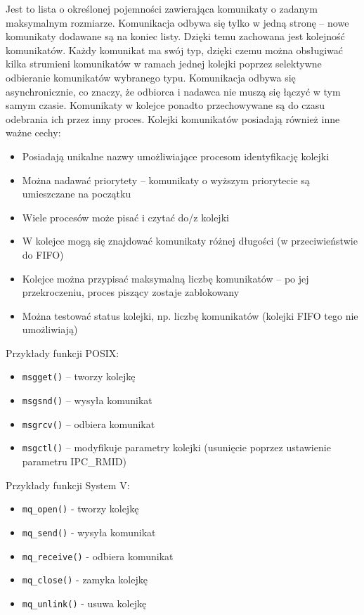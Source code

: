 Jest to lista o określonej pojemności zawierająca komunikaty o zadanym maksymalnym rozmiarze. Komunikacja odbywa się tylko w jedną stronę -- nowe komunikaty dodawane są na koniec listy. Dzięki temu zachowana jest kolejność komunikatów. Każdy komunikat ma swój typ, dzięki czemu można obsługiwać kilka strumieni komunikatów w ramach jednej kolejki poprzez selektywne odbieranie komunikatów wybranego typu. Komunikacja odbywa się asynchronicznie, co znaczy, że odbiorca i nadawca nie muszą się łączyć w tym samym czasie. Komunikaty w kolejce ponadto przechowywane są do czasu odebrania ich przez inny proces. Kolejki komunikatów posiadają również inne ważne cechy:
\begin{itemize}
	\item Posiadają unikalne nazwy umożliwiające procesom identyfikację kolejki
    \item Można nadawać priorytety -- komunikaty o wyższym priorytecie są umieszczane na początku
    \item Wiele procesów może pisać i czytać do/z kolejki
    \item W kolejce mogą się znajdować komunikaty różnej długości (w przeciwieństwie do FIFO)
    \item Kolejce można przypisać maksymalną liczbę komunikatów -- po jej przekroczeniu, proces piszący zostaje zablokowany
    \item Można testować status kolejki, np. liczbę komunikatów (kolejki FIFO tego nie umożliwiają)
\end{itemize}

Przykłady funkcji POSIX:
\begin{itemize}
	\item \texttt{msgget()} -- tworzy kolejkę
    \item \texttt{msgsnd()} -- wysyła komunikat
    \item \texttt{msgrcv()} -- odbiera komunikat
    \item \texttt{msgctl()} -- modyfikuje parametry kolejki (usunięcie poprzez ustawienie parametru IPC\_RMID)
\end{itemize}

Przykłady funkcji System V:
\begin{itemize}
	\item \texttt{mq\_open()} - tworzy kolejkę
    \item \texttt{mq\_send()} - wysyła komunikat
    \item \texttt{mq\_receive()} - odbiera komunikat
    \item \texttt{mq\_close()} - zamyka kolejkę
    \item \texttt{mq\_unlink()} - usuwa kolejkę
\end{itemize}


